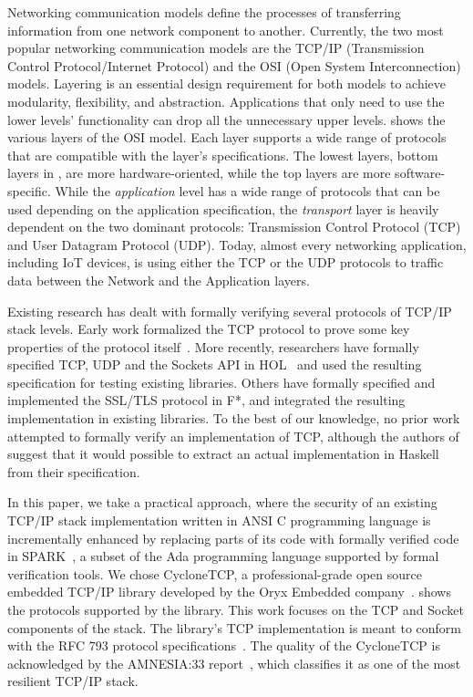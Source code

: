 \documentclass[conference]{IEEEtran}
\begin{document}
Networking communication models define the processes of transferring information from one network component to another. Currently, the two most popular networking communication models are the TCP/IP (Transmission Control Protocol/Internet Protocol) \cite{TCP_IP:ietf_tutorial} and the OSI (Open System Interconnection) \cite{ISO:35.100} models. Layering is an essential design requirement for both models to achieve modularity, flexibility, and abstraction. Applications that only need to use the lower levels' functionality can drop all the unnecessary upper levels.  shows the various layers of the OSI model. Each layer supports a wide range of protocols that are compatible with the layer's specifications. The lowest layers, bottom layers in , are more hardware-oriented, while the top layers are more software-specific. While the \emph{application} level has a wide range of protocols that can be used depending on the application specification, the \emph{transport} layer is heavily dependent on the two dominant protocols: Transmission Control Protocol (TCP) and User Datagram Protocol (UDP). Today, almost every networking application, including IoT devices, is using either the TCP or the UDP protocols to traffic data between the Network and the Application layers. %



Existing research has dealt with formally verifying several protocols of TCP/IP stack levels. Early work formalized the TCP protocol to prove some key properties of the protocol itself~\cite{smith1996formal}. More recently, researchers have formally specified TCP, UDP and the Sockets API in HOL~\cite{tcp2005sigcomm,ridge2008rigorous} and used the resulting specification for testing existing libraries. Others have formally specified and implemented the SSL/TLS protocol in F*\cite{bhargavan2013implementing}, and integrated the resulting implementation in existing libraries. To the best of our knowledge, no prior work attempted to formally verify an implementation of TCP, although the authors of~\cite{ridge2008rigorous} suggest that it would possible to extract an actual implementation in Haskell from their specification.

In this paper, we take a practical approach, where the security of an existing TCP/IP stack implementation written in ANSI C programming language is incrementally enhanced by replacing parts of its code with formally verified code in SPARK~\cite{mccormick_chapin_2015}, a subset of the Ada programming language supported by formal verification tools. We chose CycloneTCP, a professional-grade open source embedded TCP/IP library developed by the Oryx Embedded company~\cite{CycloneTCP}.  shows the protocols supported by the library. This work focuses on the TCP and Socket components of the stack. The library's TCP implementation is meant to conform with the RFC 793 protocol specifications~\cite{rfc793}. The quality of the CycloneTCP is acknowledged by the AMNESIA:33 report~\cite{AMNESIA33}, which classifies it as one of the most resilient TCP/IP stack.
\end{document}
